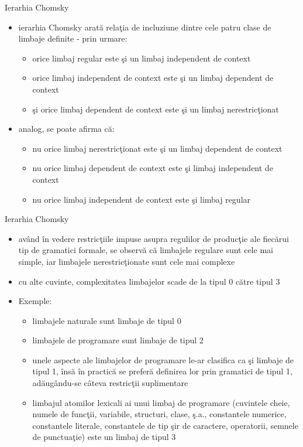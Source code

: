 \documentclass[pdf]{beamer}
\begin{document}
\begin{frame}{Ierarhia Chomsky}
\begin{itemize}
\item
ierarhia Chomsky arată relaţia de incluziune dintre cele patru clase de limbaje definite - prin urmare: 
\begin{itemize}
\item
orice limbaj regular este şi un limbaj independent de context
\item
orice limbaj independent de context este şi un limbaj dependent de context
\item
şi orice limbaj dependent de context este şi un limbaj nerestricţionat
\end{itemize}
\item
analog, se poate afirma că: 
\begin{itemize}
\item
nu orice limbaj nerestricţionat este şi un limbaj dependent de context
\item
nu orice limbaj dependent de context este şi limbaj independent de context
\item
nu orice limbaj independent de context este şi limbaj regular
\end{itemize}
\end{itemize}
\end{frame}



\begin{frame}{Ierarhia Chomsky}
\begin{itemize}
\item
având în vedere restricţiile impuse asupra regulilor de producţie ale fiecărui tip de gramatici formale, se observă că limbajele regulare sunt cele mai simple, iar limbajele nerestricţionate sunt cele mai complexe
\item
cu alte cuvinte, complexitatea limbajelor scade de la tipul 0 către tipul 3
\item
Exemple:
\begin{itemize}
\item
limbajele naturale sunt limbaje de tipul 0
\item
limbajele de programare sunt limbaje de tipul 2 
\item
unele aspecte ale limbajelor de programare le-ar clasifica ca şi limbaje de tipul 1, însă în practică se preferă definirea lor prin gramatici de tipul 1, adăugându-se câteva restricţii suplimentare
\item
limbajul atomilor lexicali ai unui limbaj de programare (cuvintele cheie, numele de funcţii, variabile, structuri, clase, ş.a., constantele numerice, constantele literale, constantele de tip şir de caractere, operatorii, semnele de punctuaţie) este un limbaj de tipul 3
\end{itemize}
\end{itemize}
\end{frame}
\end{document}
